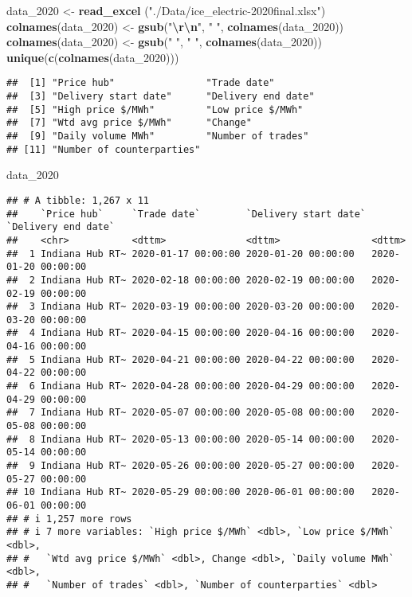 \documentclass[
]{article}
\newenvironment{Shaded}{\begin{snugshade}}{\end{snugshade}}
\newcommand{\FunctionTok}[1]{\textcolor[rgb]{0.13,0.29,0.53}{\textbf{#1}}}
\newcommand{\NormalTok}[1]{#1}
\newcommand{\OtherTok}[1]{\textcolor[rgb]{0.56,0.35,0.01}{#1}}
\newcommand{\SpecialCharTok}[1]{\textcolor[rgb]{0.81,0.36,0.00}{\textbf{#1}}}
\newcommand{\StringTok}[1]{\textcolor[rgb]{0.31,0.60,0.02}{#1}}
\begin{document}
\begin{Shaded}
\begin{Highlighting}[]
\NormalTok{data\_2020 }\OtherTok{\textless{}{-}} \FunctionTok{read\_excel}\NormalTok{ (}\StringTok{"./Data/ice\_electric{-}2020final.xlsx"}\NormalTok{)}
\FunctionTok{colnames}\NormalTok{(data\_2020) }\OtherTok{\textless{}{-}} \FunctionTok{gsub}\NormalTok{(}\StringTok{"}\SpecialCharTok{\textbackslash{}r\textbackslash{}n}\StringTok{"}\NormalTok{, }\StringTok{" "}\NormalTok{, }\FunctionTok{colnames}\NormalTok{(data\_2020))}
\FunctionTok{colnames}\NormalTok{(data\_2020) }\OtherTok{\textless{}{-}} \FunctionTok{gsub}\NormalTok{(}\StringTok{"  "}\NormalTok{, }\StringTok{" "}\NormalTok{, }\FunctionTok{colnames}\NormalTok{(data\_2020))}
\FunctionTok{unique}\NormalTok{(}\FunctionTok{c}\NormalTok{(}\FunctionTok{colnames}\NormalTok{(data\_2020)))}
\end{Highlighting}
\end{Shaded}

\begin{verbatim}
##  [1] "Price hub"                "Trade date"              
##  [3] "Delivery start date"      "Delivery end date"       
##  [5] "High price $/MWh"         "Low price $/MWh"         
##  [7] "Wtd avg price $/MWh"      "Change"                  
##  [9] "Daily volume MWh"         "Number of trades"        
## [11] "Number of counterparties"
\end{verbatim}

\begin{Shaded}
\begin{Highlighting}[]
\NormalTok{data\_2020}
\end{Highlighting}
\end{Shaded}

\begin{verbatim}
## # A tibble: 1,267 x 11
##    `Price hub`     `Trade date`        `Delivery start date` `Delivery end date`
##    <chr>           <dttm>              <dttm>                <dttm>             
##  1 Indiana Hub RT~ 2020-01-17 00:00:00 2020-01-20 00:00:00   2020-01-20 00:00:00
##  2 Indiana Hub RT~ 2020-02-18 00:00:00 2020-02-19 00:00:00   2020-02-19 00:00:00
##  3 Indiana Hub RT~ 2020-03-19 00:00:00 2020-03-20 00:00:00   2020-03-20 00:00:00
##  4 Indiana Hub RT~ 2020-04-15 00:00:00 2020-04-16 00:00:00   2020-04-16 00:00:00
##  5 Indiana Hub RT~ 2020-04-21 00:00:00 2020-04-22 00:00:00   2020-04-22 00:00:00
##  6 Indiana Hub RT~ 2020-04-28 00:00:00 2020-04-29 00:00:00   2020-04-29 00:00:00
##  7 Indiana Hub RT~ 2020-05-07 00:00:00 2020-05-08 00:00:00   2020-05-08 00:00:00
##  8 Indiana Hub RT~ 2020-05-13 00:00:00 2020-05-14 00:00:00   2020-05-14 00:00:00
##  9 Indiana Hub RT~ 2020-05-26 00:00:00 2020-05-27 00:00:00   2020-05-27 00:00:00
## 10 Indiana Hub RT~ 2020-05-29 00:00:00 2020-06-01 00:00:00   2020-06-01 00:00:00
## # i 1,257 more rows
## # i 7 more variables: `High price $/MWh` <dbl>, `Low price $/MWh` <dbl>,
## #   `Wtd avg price $/MWh` <dbl>, Change <dbl>, `Daily volume MWh` <dbl>,
## #   `Number of trades` <dbl>, `Number of counterparties` <dbl>
\end{verbatim}
\end{document}
